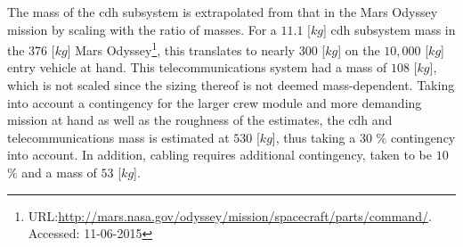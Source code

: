 The mass of the \gls{cdh} subsystem is extrapolated from that in the Mars Odyssey mission by scaling with the ratio of masses. For a $11.1$ [$kg$] \gls{cdh} subsystem mass in the 376 [$kg$] Mars Odyssey\footnote{URL:\url{http://mars.nasa.gov/odyssey/mission/spacecraft/parts/command/}. Accessed: 11-06-2015}, this translates to nearly $300$ [$kg$] on the $10,000$ [$kg$] entry vehicle at hand. This telecommunications system had a mass of $108$ [$kg$], which is not scaled since the sizing thereof is not deemed mass-dependent. Taking into account a contingency for the larger crew module and more demanding mission at hand as well as the roughness of the estimates, the \gls{cdh} and telecommunications mass is estimated at $530$ [$kg$], thus taking a $30$ $\%$ contingency into account. In addition, cabling requires additional contingency, taken to be $10$ $\%$ and a mass of $53$ [$kg$].

